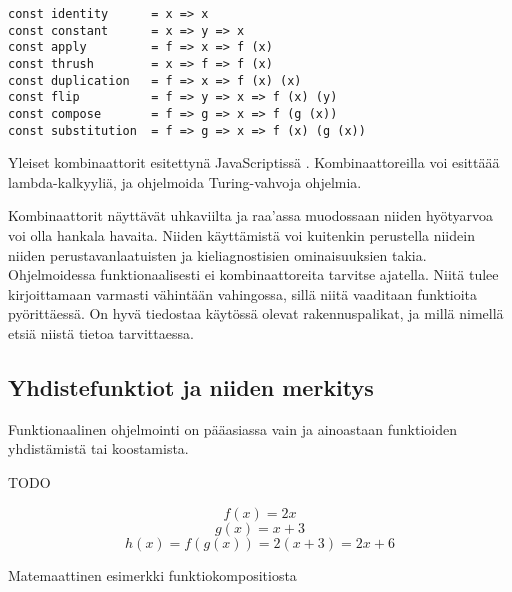 \begin{code}
	\begin{verbatim}
const identity      = x => x
const constant      = x => y => x
const apply         = f => x => f (x)
const thrush        = x => f => f (x)
const duplication   = f => x => f (x) (x)
const flip          = f => y => x => f (x) (y)
const compose       = f => g => x => f (g (x))
const substitution  = f => g => x => f (x) (g (x))

\end{verbatim}
	\caption{Yleiset kombinaattorit esitettynä JavaScriptissä \cite{javascript_combinators}. Kombinaattoreilla voi esittäää lambda-kalkyyliä, ja ohjelmoida Turing-vahvoja ohjelmia.}
	\label{code:javascript_combinators}
\end{code}

Kombinaattorit näyttävät uhkaviilta ja raa'assa muodossaan niiden hyötyarvoa voi olla hankala havaita. Niiden käyttämistä voi kuitenkin perustella niidein niiden perustavanlaatuisten ja kieliagnostisien ominaisuuksien takia. Ohjelmoidessa funktionaalisesti ei kombinaattoreita tarvitse ajatella. Niitä tulee kirjoittamaan varmasti vähintään vahingossa, sillä niitä vaaditaan funktioita pyörittäessä. On hyvä tiedostaa käytössä olevat rakennuspalikat, ja millä nimellä etsiä niistä tietoa tarvittaessa.



\subsection{Yhdistefunktiot ja niiden merkitys}

Funktionaalinen ohjelmointi on pääasiassa vain ja ainoastaan funktioiden yhdistämistä tai koostamista.


TODO

\begin{code}
	\begin{equation}
		f(x) = 2x
	\end{equation}
	\begin{equation}
		g(x) = x + 3
	\end{equation}
	\begin{equation}
		h(x) = f(g(x)) = 2(x + 3) = 2x + 6
	\end{equation}
	\caption{Matemaattinen esimerkki funktiokompositiosta}
	\label{equation:composition}
\end{code}
\bigskip

